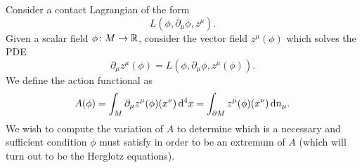 \documentclass[12pt]{article}
\begin{document}
Consider a contact Lagrangian of the form
\begin{equation}
	L(\phi, \partial_\mu \phi, z^\mu). 
\end{equation}
Given a scalar field \( \phi \colon M \to \mathbb{R} \), consider the vector field \( z^\mu(\phi) \) which solves the PDE
\begin{equation}
	\partial_\mu z^\mu(\phi) = L(\phi, \partial_\mu \phi, z^\mu(\phi)).
\end{equation}
We define the action functional as
\begin{equation}
	A(\phi) = \int_M \partial_\mu z^\mu(\phi) (x^\nu) \, \mathrm{d}^4 x =
	\int_{\partial M} z^\mu(\phi)(x^\nu) \, \mathrm{d} n_\mu.
\end{equation}
We wish to compute the variation of \( A \) to determine which is a necessary and
sufficient condition \( \phi \) must satisfy in order to be an extremum of \( A \) (which
will turn out to be the Herglotz equations). 
\end{document}
